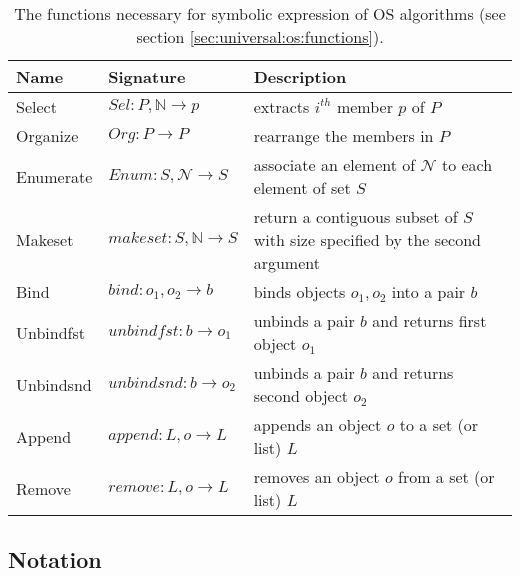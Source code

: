 \documentclass[draft]{article}
\begin{document}
\begin{table}[t]
  \begin{center}
    \begin{tabular}{|l|l|l|}
      \hline 
      \textbf{Name} & \textbf{Signature} & \textbf{Description} \\
      \hline 
      Select & $Sel : P, \mathbb{N}  \rightarrow p$ &
      extracts $i^{th}$ member $p$ of $P$ \\
      Organize & $Org : P \rightarrow  P$ & rearrange the members in $P$ \\
      Enumerate &  $Enum:  S, \mathcal{N}   \rightarrow  S$ &
      associate  an element  of  $\mathcal{N}$ to  each element of set $S$ \\
      Makeset & $makeset: S, \mathbb{N} \rightarrow S$ & 
      \parbox[t]{.4\textwidth}{return a
        contiguous subset of $S$ with size specified by the second
        argument} \\
      Bind & $bind: o_1,o_2  \rightarrow  b$ & binds objects $o_1, o_2$
      into a pair $b$ \\
      Unbindfst & $unbindfst: b \rightarrow  o_1 $ & unbinds a pair $b$
      and returns first object $o_1$ \\
      Unbindsnd & $unbindsnd: b \rightarrow  o_2 $ & unbinds a pair $b$
      and returns second object $o_2$ \\
      Append & $append: L,o  \rightarrow L$ & appends an object $o$ to a
      set (or list) $L$ \\
      Remove & $remove: L,o  \rightarrow L$ & removes an object $o$ from
      a set (or list) $L$ \\
      \hline 
    \end{tabular}
  \end{center}
  \caption[Functions necessary for an OS]{The functions necessary for
    symbolic expression of OS algorithms (see section
    \ref{sec:universal:os:functions}).}
  \label{tab:os:functions}
\end{table}

\subsection{Notation}
\label{sec:notation}
\end{document}
